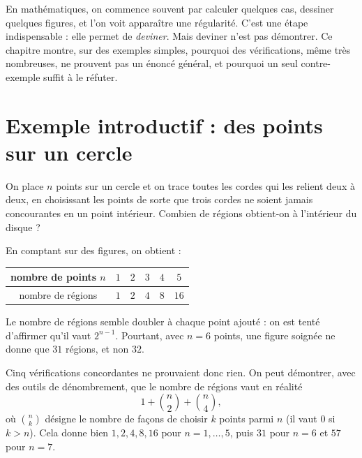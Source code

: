 \documentclass[11pt]{article}
\begin{document}

En mathématiques, on commence souvent par calculer quelques cas, dessiner
quelques figures, et l'on voit apparaître une régularité. C'est une étape
indispensable : elle permet de \emph{deviner}. Mais deviner n'est pas
démontrer. Ce chapitre montre, sur des exemples simples, pourquoi des
vérifications, même très nombreuses, ne prouvent pas un énoncé général, et
pourquoi un seul contre-exemple suffit à le réfuter.

\section{Exemple introductif : des points sur un cercle}\label{sec:exemple-introductif}

On place $n$ points sur un cercle et on trace toutes les cordes qui les
relient deux à deux, en choisissant les points de sorte que trois cordes ne
soient jamais concourantes en un point intérieur. Combien de régions
obtient-on à l'intérieur du disque ?

\begin{center}
\end{center}

En comptant sur des figures, on obtient :
\begin{center}
\begin{tabular}{c|ccccc}
  nombre de points $n$ & $1$ & $2$ & $3$ & $4$ & $5$ \\ \hline
  nombre de régions    & $1$ & $2$ & $4$ & $8$ & $16$
\end{tabular}
\end{center}
Le nombre de régions semble doubler à chaque point ajouté : on est tenté
d'affirmer qu'il vaut $2^{n-1}$. Pourtant, avec $n = 6$ points, une figure
soignée ne donne que $31$ régions, et non $32$.

\medskip
Cinq vérifications concordantes ne prouvaient donc rien. On peut démontrer,
avec des outils de dénombrement, que le nombre de régions vaut en réalité
\[
1 + \binom{n}{2} + \binom{n}{4},
\]
où $\binom{n}{k}$ désigne le nombre de façons de choisir $k$ points parmi
$n$ (il vaut $0$ si $k > n$). Cela donne bien $1, 2, 4, 8, 16$ pour $n = 1, \ldots, 5$, puis $31$ pour
$n = 6$ et $57$ pour $n = 7$.
\end{document}
